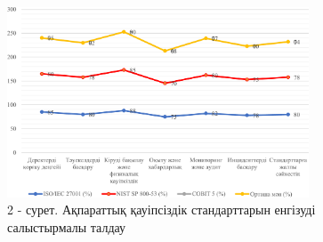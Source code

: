 \begin{figure}[H]
	\centering
	\includegraphics[width=0.8\textwidth]{media/ict4/image2}
	\caption*{2 - сурет. Ақпараттық қауіпсіздік стандарттарын енгізуді
салыстырмалы талдау}
\end{figure}

